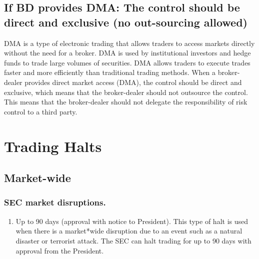 \documentclass[11pt]{article}
\begin{document}
\subsection{If BD provides DMA: The control should be direct and exclusive (no out-sourcing allowed)}
\label{sec:orgc8010fa}
DMA is a type of electronic trading that allows traders to access markets directly without the need for a broker.
DMA is used by institutional investors and hedge funds to trade large volumes of securities.
DMA allows traders to execute trades faster and more efficiently than traditional trading methods.
When a broker-dealer provides direct market access (DMA), the control should be direct and exclusive,
which means that the broker-dealer should not outsource the control.
This means that the broker-dealer should not delegate the responsibility of risk control to a third party.

\section{Trading Halts}
\label{sec:org4129667}
\subsection{Market-wide}
\label{sec:org5c225c9}
\subsubsection{SEC market disruptions.}
\label{sec:orgd8cb397}
\begin{enumerate}
\item Up to 90 days (approval with notice to President).
\label{sec:orge3f63d5}
This type of halt is used when there is a market*wide disruption due to an event such as a natural disaster or terrorist attack. The SEC can halt trading for up to 90 days with approval from the President.
\end{enumerate}
\end{document}
